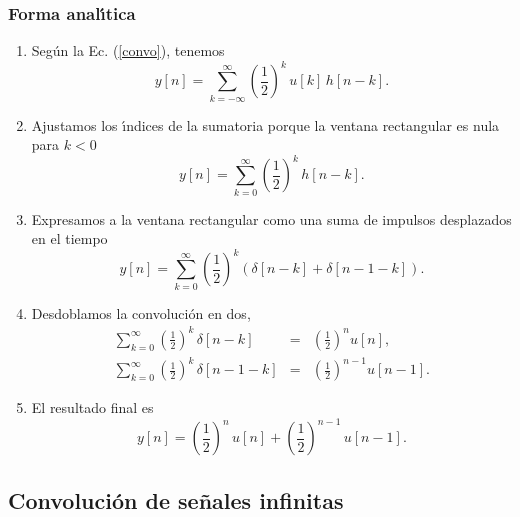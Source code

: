 \subsubsection{Forma anal\'{\i}tica}


\begin{enumerate}
\item Seg\'{u}n la Ec. (\ref{convo}), tenemos
  \begin{equation}
    y\left[ n\right] =
    \sum_{k=-\infty }^{\infty }\left( \frac{1}{2}\right) ^{k} \,
    u\left[ k\right] \, h\left[ n-k\right].
  \end{equation}

\item Ajustamos los \'{\i}ndices de la sumatoria porque la ventana
  rectangular es nula para $k < 0$
  \begin{equation}
    y\left[ n\right] =
    \sum_{k=0}^{\infty }\left( \frac{1}{2}\right) ^{k} \, h\left[n-k\right].
  \end{equation}
        
\item Expresamos a la ventana rectangular como una suma de impulsos
  desplazados en el tiempo
  \begin{equation}
    y\left[ n\right] =
    \sum_{k=0}^{\infty }
    \left( \frac{1}{2}\right) ^{k}\left(\delta \left[ n-k\right] +\delta \left[ n-1-k\right] \right).
  \end{equation}
        
\item Desdoblamos la convoluci\'{o}n en dos,
  \begin{eqnarray}
    \sum_{k=0}^{\infty }\left( \frac{1}{2}\right) ^{k} \, \delta \left[ n-k\right]
    &=&\left( \frac{1}{2}\right) ^n u[n], \\
    \sum_{k=0}^{\infty }\left( \frac{1}{2}\right) ^{k} \, \delta \left[ n-1-k\right]
    &=&\left( \frac{1}{2}\right) ^{n-1} u[n-1].
  \end{eqnarray}
        
\item El resultado final es
  \begin{equation}
    y\left[ n\right] =\left( \frac{1}{2}\right)^n \, u[n] +\left(
      \frac{1}{2}\right)^{n-1} \, u[n-1].
  \end{equation}
\end{enumerate}

\subsection{Convoluci\'{o}n de se\~{n}ales infinitas}

